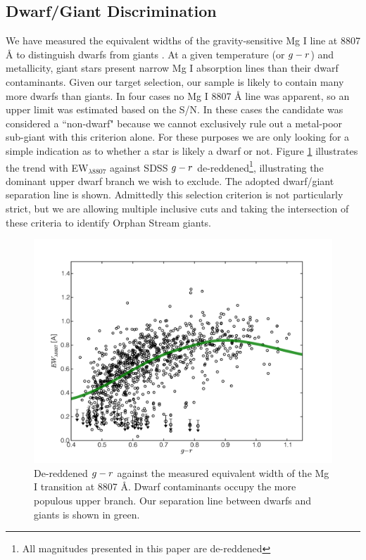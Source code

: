 \documentclass{emulateapj}
\begin{document}
\subsection{Dwarf/Giant Discrimination}
\label{sec:dwarf-giant}

We have measured the equivalent widths of the gravity-sensitive Mg I line at 8807 \AA{} to distinguish dwarfs from giants \citep{Battaglia;Starkenburg_2012}. At a given temperature (or $g \-- r$) and metallicity, giant stars present narrow Mg I absorption lines than their dwarf contaminants. Given our target selection, our sample is likely to contain many more dwarfs than giants. In four cases no Mg I 8807 \AA{} line was apparent, so an upper limit was estimated based on the S/N. In these cases the candidate was considered a ``non-dwarf" because we cannot exclusively rule out a metal-poor sub-giant with this criterion alone. For these purposes we are only looking for a simple indication as to whether a star is likely a dwarf or not. Figure \ref{fig:ew-mg} illustrates the trend with EW$_{\lambda8807}$ against SDSS $g \-- r$ de-reddened\footnote{All magnitudes presented in this paper are de-reddened}, illustrating the dominant upper dwarf branch we wish to exclude. The adopted dwarf/giant separation line is shown. Admittedly this selection criterion is not particularly strict, but we are allowing multiple inclusive cuts and taking the intersection of these criteria to identify Orphan Stream giants.

\begin{figure}[h]
	\includegraphics[width=\columnwidth]{./figures/ew-mg.pdf}
	\caption{De-reddened $g \-- r$ against the measured equivalent width of the Mg I transition at 8807 \AA{}. Dwarf contaminants occupy the more populous upper branch. Our separation line between dwarfs and giants is shown in green.}
	\label{fig:ew-mg}
\end{figure}
\end{document}
